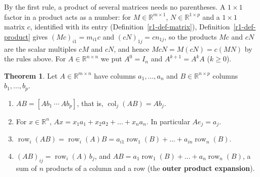 \documentclass[12pt]{article}
\newcommand{\R}{\mathbb R}
\DeclareMathOperator{\row}{row}
\DeclareMathOperator{\col}{col}
\theoremstyle{definition}
\newtheorem{theorem}{Theorem}
\begin{document}
By the first rule, a product of several matrices needs no parentheses. A \(1\times1\) factor in a product acts as
a number: for \(M\in\R^{m\times1}\), \(N\in\R^{1\times p}\) and a \(1\times1\) matrix \(c\), identified with its entry
(Definition~\ref{r1-def-matrix}), Definition~\ref{r1-def-product} gives \((Mc)_{i1}=m_{i1}c\) and
\((cN)_{1j}=cn_{1j}\), so the products \(Mc\) and \(cN\) are the scalar multiples \(cM\) and \(cN\), and hence
\(McN=M(cN)=c(MN)\) by the rules above. For \(A\in\R^{n\times n}\) we put \(A^0=I_n\) and \(A^{k+1}=A^kA\)
(\(k\geqslant0\)).

\begin{theorem}\label{r1-thm-views}
Let \(A\in\R^{m\times n}\) have columns \(a_1,\dots,a_n\) and \(B\in\R^{n\times p}\) columns
\(b_1,\dots,b_p\).
\begin{enumerate}
\item \(AB=[Ab_1\ \cdots\ Ab_p]\), that is, \(\col_j(AB)=Ab_j\).
\item For \(x\in\R^n\), \(Ax=x_1a_1+x_2a_2+\dots+x_na_n\). In particular \(Ae_j=a_j\).
\item \(\row_i(AB)=\row_i(A)B=a_{i1}\row_1(B)+\dots+a_{in}\row_n(B)\).
\item \((AB)_{ij}=\row_i(A)\,b_j\), and \(AB=a_1\row_1(B)+\dots+a_n\row_n(B)\), a sum of \(n\)
products of a column and a row (the \textbf{outer product expansion}).
\end{enumerate}
\end{theorem}
\end{document}

